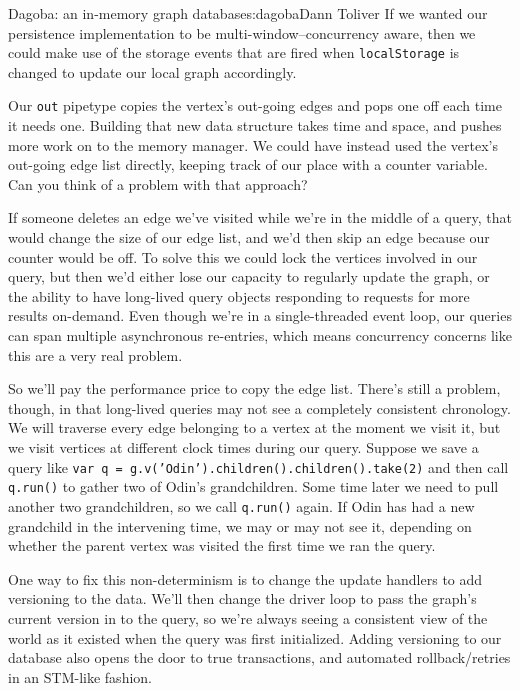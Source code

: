 \begin{aosachapter}{Dagoba: an in-memory graph database}{s:dagoba}{Dann Toliver}
If we wanted our persistence implementation to be
multi-window--concurrency aware, then we could make use of the storage
events that are fired when \texttt{localStorage} is changed to update
our local graph accordingly.

\label{updates}

Our \texttt{out} pipetype copies the vertex's out-going edges and pops
one off each time it needs one. Building that new data structure takes
time and space, and pushes more work on to the memory manager. We could
have instead used the vertex's out-going edge list directly, keeping
track of our place with a counter variable. Can you think of a problem
with that approach?

If someone deletes an edge we've visited while we're in the middle of a
query, that would change the size of our edge list, and we'd then skip
an edge because our counter would be off. To solve this we could lock
the vertices involved in our query, but then we'd either lose our
capacity to regularly update the graph, or the ability to have
long-lived query objects responding to requests for more results
on-demand. Even though we're in a single-threaded event loop, our
queries can span multiple asynchronous re-entries, which means
concurrency concerns like this are a very real problem.

So we'll pay the performance price to copy the edge list. There's still
a problem, though, in that long-lived queries may not see a completely
consistent chronology. We will traverse every edge belonging to a vertex
at the moment we visit it, but we visit vertices at different clock
times during our query. Suppose we save a query like
\texttt{var q = g.v('Odin').children().children().take(2)} and then call
\texttt{q.run()} to gather two of Odin's grandchildren. Some time later
we need to pull another two grandchildren, so we call \texttt{q.run()}
again. If Odin has had a new grandchild in the intervening time, we may
or may not see it, depending on whether the parent vertex was visited
the first time we ran the query.

One way to fix this non-determinism is to change the update handlers to
add versioning to the data. We'll then change the driver loop to pass
the graph's current version in to the query, so we're always seeing a
consistent view of the world as it existed when the query was first
initialized. Adding versioning to our database also opens the door to
true transactions, and automated rollback/retries in an STM-like
fashion.


\end{aosachapter}

